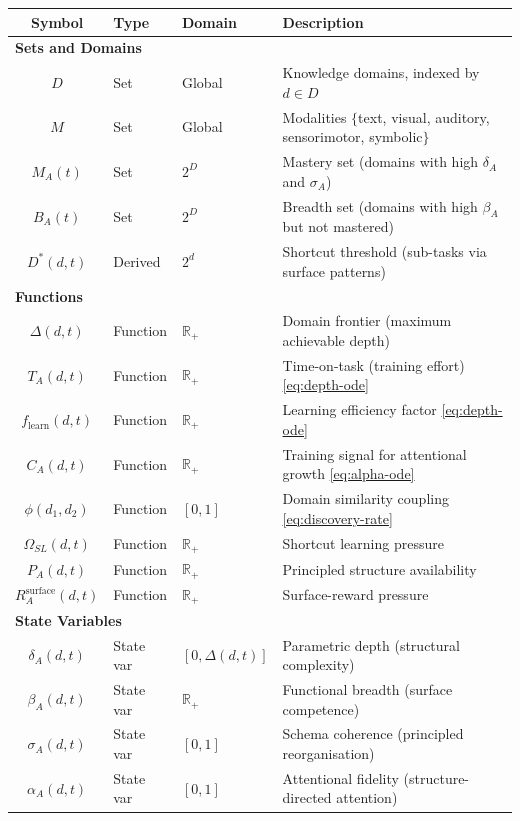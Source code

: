 \documentclass[10pt]{article}
\newcommand{\R}{\mathbb{R}}
\begin{document}
\begin{center}
\footnotesize
\setlength{\tabcolsep}{4pt}
\begin{tabular}{c l l l}
\toprule
\textbf{Symbol} & \textbf{Type} & \textbf{Domain} & \textbf{Description} \\
\midrule
\multicolumn{4}{l}{\textbf{Sets and Domains}} \\
$D$ & Set & Global & Knowledge domains, indexed by $d \in D$ \\
$M$ & Set & Global & Modalities $\{$text, visual, auditory, sensorimotor, symbolic$\}$ \\
$M_A(t)$ & Set & $2^D$ & Mastery set (domains with high $\delta_A$ and $\sigma_A$) \\
$B_A(t)$ & Set & $2^D$ & Breadth set (domains with high $\beta_A$ but not mastered) \\
$D^*(d,t)$ & Derived & $2^d$ & Shortcut threshold (sub-tasks via surface patterns) \\
\multicolumn{4}{l}{\textbf{Functions}} \\
$\Delta(d,t)$ & Function & $\R_+$ & Domain frontier (maximum achievable depth) \\
$T_A(d,t)$ & Function & $\R_+$ & Time-on-task (training effort) \hfill\eqref{eq:depth-ode} \\
$f_{\text{learn}}(d,t)$ & Function & $\R_+$ & Learning efficiency factor \hfill\eqref{eq:depth-ode} \\
$C_A(d,t)$ & Function & $\R_+$ & Training signal for attentional growth \hfill\eqref{eq:alpha-ode} \\
$\phi(d_1,d_2)$ & Function & $[0,1]$ & Domain similarity coupling \hfill\eqref{eq:discovery-rate} \\
$\Omega_{SL}(d,t)$ & Function & $\R_+$ & Shortcut learning pressure \\
$P_A(d,t)$ & Function & $\R_+$ & Principled structure availability \\
$R_A^{\text{surface}}(d,t)$ & Function & $\R_+$ & Surface-reward pressure \\
\multicolumn{4}{l}{\textbf{State Variables}} \\
$\delta_A(d,t)$ & State var & $[0, \Delta(d,t)]$ & Parametric depth (structural complexity) \\
$\beta_A(d,t)$ & State var & $\R_+$ & Functional breadth (surface competence) \\
$\sigma_A(d,t)$ & State var & $[0,1]$ & Schema coherence (principled reorganisation) \\
$\alpha_A(d,t)$ & State var & $[0,1]$ & Attentional fidelity (structure-directed attention) \\

\end{tabular}
\end{center}
\end{document}
